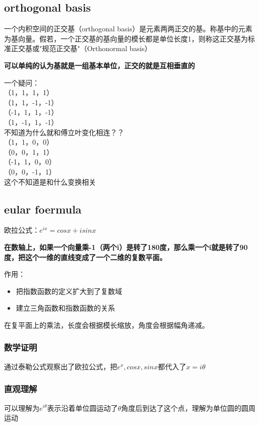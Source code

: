 \documentclass[UTF8]{ctexart}
\begin{document}
\subsection{orthogonal basis}

一个内积空间的正交基（orthogonal basis）是元素两两正交的基。称基中的元素为基向量。假若，一个正交基的基向量的模长都是单位长度1，则称这正交基为标准正交基或"规范正交基"（Orthonormal basis）

\textbf{可以单纯的认为基就是一组基本单位，正交的就是互相垂直的}

一个疑问：\\
（1，1，1，1）\\
（1，1，-1，-1）\\
（-1，1，1，-1）\\
（1，-1，1，-1）\\
不知道为什么就和傅立叶变化相连？？\\
（1，1，0，0）\\
（0，0，1，1）\\
（-1，1，0，0）\\
（0，0，-1，1）\\
这个不知道是和什么变换相关

\subsection{eular foermula}
欧拉公式：$e^{ix} = cosx + isinx$

\textbf{在数轴上，如果一个向量乘-1（两个i）是转了180度，那么乘一个i就是转了90度，把这个一维的直线变成了一个二维的复数平面。}

\noindent 作用：
\begin{itemize}
    \item 把指数函数的定义扩大到了复数域
    \item 建立三角函数和指数函数的关系
\end {itemize}

在复平面上的乘法，长度会根据模长缩放，角度会根据幅角递减。

\subsubsection*{数学证明}
通过泰勒公式观察出了欧拉公式，把$e^{x},cosx,sinx$都代入了$x=i\theta$

\subsubsection*{直观理解}
可以理解为$e^{i\theta}$表示沿着单位圆运动了$\theta$角度后到达了这个点，理解为单位圆的圆周运动
\end{document}
